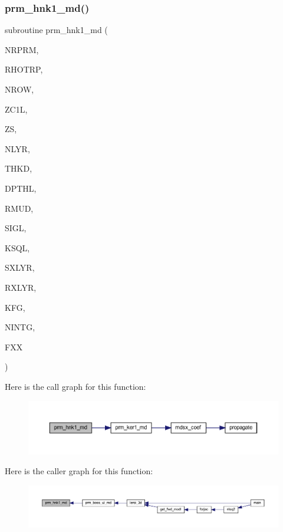 \subsubsection{\texorpdfstring{prm\+\_\+hnk1\+\_\+md()}{prm\_hnk1\_md()}}
{\footnotesize\ttfamily subroutine prm\+\_\+hnk1\+\_\+md (\begin{DoxyParamCaption}\item[{integer}]{N\+R\+P\+RM,  }\item[{real, dimension(nrprm)}]{R\+H\+O\+T\+RP,  }\item[{integer}]{N\+R\+OW,  }\item[{real, dimension(nrow)}]{Z\+C1L,  }\item[{real(kind=ql)}]{ZS,  }\item[{integer}]{N\+L\+YR,  }\item[{real(kind=ql), dimension (nlyr)}]{T\+H\+KD,  }\item[{real(kind=ql), dimension (nlyr)}]{D\+P\+T\+HL,  }\item[{real(kind=ql), dimension(0\+:nlyr)}]{R\+M\+UD,  }\item[{complex(kind=ql), dimension (nlyr)}]{S\+I\+GL,  }\item[{complex(kind=ql), dimension (nlyr)}]{K\+S\+QL,  }\item[{integer}]{S\+X\+L\+YR,  }\item[{integer}]{R\+X\+L\+YR,  }\item[{integer}]{K\+FG,  }\item[{integer}]{N\+I\+N\+TG,  }\item[{complex(kind=ql), dimension(nrprm,5,nrow)}]{F\+XX }\end{DoxyParamCaption})}

Here is the call graph for this function\+:\nopagebreak
\begin{figure}[H]
\begin{center}
\leavevmode
\includegraphics[width=350pt]{Leroi_8f90_a90b2b96ee9e9153503bfd5d5bf7d1d0e_cgraph}
\end{center}
\end{figure}
Here is the caller graph for this function\+:\nopagebreak
\begin{figure}[H]
\begin{center}
\leavevmode
\includegraphics[width=350pt]{Leroi_8f90_a90b2b96ee9e9153503bfd5d5bf7d1d0e_icgraph}
\end{center}
\end{figure}
\mbox{\label{Leroi_8f90_addd341d907a00b743326c01025f01020}} 

